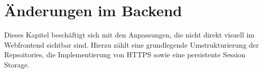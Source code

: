 \section{Änderungen im Backend}\label{sec:aenderungen-im-backend}
Dieses Kapitel beschäftigt sich mit den Anpassungen, die nicht direkt visuell im Webfrontend sichtbar sind.
Hierzu zählt eine grundlegende Umstrukturierung der Repsoitories, die Implementierung von HTTPS sowie eine persistente Session Storage.


\newpage

\newpage
